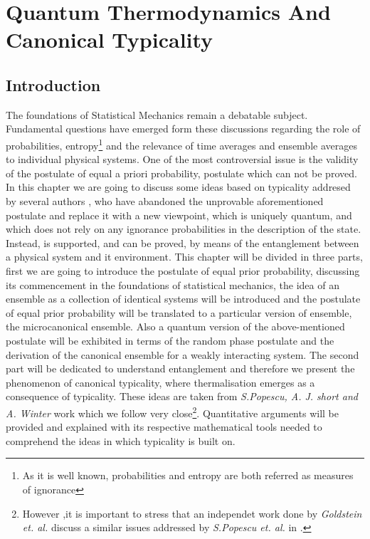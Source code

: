\chapter{Quantum Thermodynamics And Canonical Typicality}
\section{Introduction}

The foundations of Statistical Mechanics remain a debatable subject. Fundamental questions have emerged form these discussions regarding the role of probabilities, entropy\footnote{ As  it is well known, probabilities and entropy are both referred as measures of ignorance} and the relevance of time averages and ensemble averages to individual physical systems. One of the most controversial issue is the validity of the postulate of equal a priori probability, postulate which can not be proved. \\
In this chapter we are going to discuss some ideas based on typicality addresed by several authors \cite{gemmer_quantum_2004, goldstein_canonical_2006, popescu_entanglement_2006}, who have abandoned the unprovable aforementioned postulate and replace it with a new viewpoint, which is uniquely quantum, and which does not rely on any ignorance probabilities in the description of the state. Instead, is supported, and can be proved, by means of the entanglement between a physical system and it environment. 
\newline
This chapter will be divided in three parts, first we are going to introduce the postulate of equal prior probability, discussing its commencement in the foundations of statistical mechanics, the idea of an ensemble as a collection of identical systems will be introduced and the postulate of equal prior probability will be translated  to a particular version of ensemble, the microcanonical ensemble. Also a quantum version of the above-mentioned postulate will be exhibited in terms of the random phase postulate \cite{landau_statistical_2013} and the derivation of the canonical ensemble for a weakly interacting system.
\newline
The second part will be dedicated to understand entanglement and therefore we present the phenomenon of canonical typicality, where thermalisation emerges as a consequence of typicality. These ideas are taken from  \textit{S.Popescu, A. J. short and A. Winter} \cite{popescu_entanglement_2006, popescu_foundations_2005} work which we follow very close\footnote{However ,it is important to stress that an independet work done by \textit{Goldstein et. al.} \cite{goldstein_canonical_2006} discuss a similar issues addressed by  \textit{S.Popescu et. al.} in \cite{popescu_entanglement_2006, popescu_foundations_2005}.}. Quantitative arguments will be provided and explained with its respective mathematical tools needed to comprehend the ideas in which typicality is built on.
